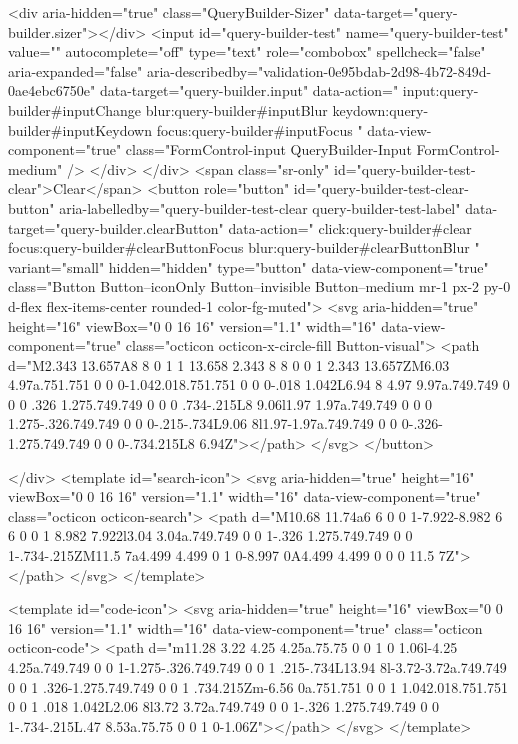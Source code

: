             <div aria-hidden="true" class="QueryBuilder-Sizer" data-target="query-builder.sizer"></div>
            <input id="query-builder-test" name="query-builder-test" value="" autocomplete="off" type="text" role="combobox" spellcheck="false" aria-expanded="false" aria-describedby="validation-0e95bdab-2d98-4b72-849d-0ae4ebc6750e" data-target="query-builder.input" data-action="
          input:query-builder#inputChange
          blur:query-builder#inputBlur
          keydown:query-builder#inputKeydown
          focus:query-builder#inputFocus
        " data-view-component="true" class="FormControl-input QueryBuilder-Input FormControl-medium" />
          </div>
        </div>
          <span class="sr-only" id="query-builder-test-clear">Clear</span>
          <button role="button" id="query-builder-test-clear-button" aria-labelledby="query-builder-test-clear query-builder-test-label" data-target="query-builder.clearButton" data-action="
                click:query-builder#clear
                focus:query-builder#clearButtonFocus
                blur:query-builder#clearButtonBlur
              " variant="small" hidden="hidden" type="button" data-view-component="true" class="Button Button--iconOnly Button--invisible Button--medium mr-1 px-2 py-0 d-flex flex-items-center rounded-1 color-fg-muted">  <svg aria-hidden="true" height="16" viewBox="0 0 16 16" version="1.1" width="16" data-view-component="true" class="octicon octicon-x-circle-fill Button-visual">
    <path d="M2.343 13.657A8 8 0 1 1 13.658 2.343 8 8 0 0 1 2.343 13.657ZM6.03 4.97a.751.751 0 0 0-1.042.018.751.751 0 0 0-.018 1.042L6.94 8 4.97 9.97a.749.749 0 0 0 .326 1.275.749.749 0 0 0 .734-.215L8 9.06l1.97 1.97a.749.749 0 0 0 1.275-.326.749.749 0 0 0-.215-.734L9.06 8l1.97-1.97a.749.749 0 0 0-.326-1.275.749.749 0 0 0-.734.215L8 6.94Z"></path>
</svg>
</button>

      </div>
      <template id="search-icon">
  <svg aria-hidden="true" height="16" viewBox="0 0 16 16" version="1.1" width="16" data-view-component="true" class="octicon octicon-search">
    <path d="M10.68 11.74a6 6 0 0 1-7.922-8.982 6 6 0 0 1 8.982 7.922l3.04 3.04a.749.749 0 0 1-.326 1.275.749.749 0 0 1-.734-.215ZM11.5 7a4.499 4.499 0 1 0-8.997 0A4.499 4.499 0 0 0 11.5 7Z"></path>
</svg>
</template>

<template id="code-icon">
  <svg aria-hidden="true" height="16" viewBox="0 0 16 16" version="1.1" width="16" data-view-component="true" class="octicon octicon-code">
    <path d="m11.28 3.22 4.25 4.25a.75.75 0 0 1 0 1.06l-4.25 4.25a.749.749 0 0 1-1.275-.326.749.749 0 0 1 .215-.734L13.94 8l-3.72-3.72a.749.749 0 0 1 .326-1.275.749.749 0 0 1 .734.215Zm-6.56 0a.751.751 0 0 1 1.042.018.751.751 0 0 1 .018 1.042L2.06 8l3.72 3.72a.749.749 0 0 1-.326 1.275.749.749 0 0 1-.734-.215L.47 8.53a.75.75 0 0 1 0-1.06Z"></path>
</svg>
</template>

